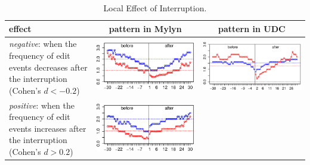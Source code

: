 \documentclass[times]{smrauth}
\begin{document}
\begin{table}[ht!]
\caption{Local Effect of Interruption. }
\label{tbl:local_effect}
\centering
\begin{tabular}{p{5cm} | c | c}
effect & pattern in Mylyn & pattern in UDC \\
\hline
\textit{negative}: when the frequency of edit events decreases after the interruption (Cohen's $d < -0.2$)
	& \includegraphics[valign=m,scale=0.3]{figures/neg_ints}
	& \includegraphics[valign=m,scale=0.237]{figures/udc_neg_ints_2}  \\
\textit{positive}: when the frequency of edit events increases after the interruption (Cohen's $d > 0.2$)
	& \includegraphics[valign=m,scale=0.3]{figures/pos_ints}

\end{tabular}
\end{table}
\end{document}
